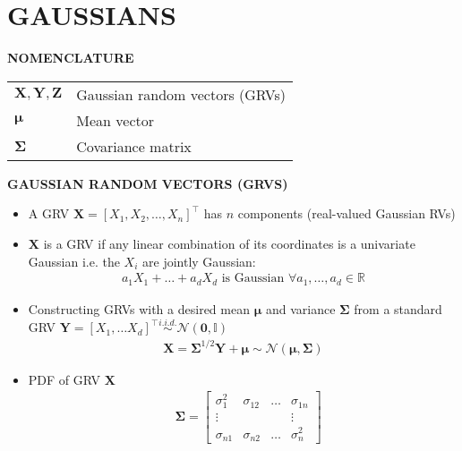 \section{GAUSSIANS}

\begin{yellowbox}{\textbf{NOMENCLATURE}}
    \begin{tabularx}{\columnwidth}{ll}
        $\bm{X},\bm{Y},\bm{Z}$ & Gaussian random vectors (GRVs)\\
        \addlinespace[2pt]
        $\bm{\mu}$ & Mean vector\\
        \addlinespace[2pt]
        $\bm{\Sigma}$ & Covariance matrix
    \end{tabularx}
\end{yellowbox}


\begin{whitebox}{\textbf{GAUSSIAN RANDOM VECTORS (GRVS)}}
    \begin{itemize}
        \item A GRV $\bm{X}=[X_1,X_2,\dots,X_n]^\top$ has $n$ components (real-valued Gaussian RVs)
        \item $\bm{X}$ is a GRV if any linear combination of its coordinates is a univariate Gaussian i.e. the $X_i$ are jointly Gaussian:
        \begin{align*}
            a_1X_1+\dots+a_dX_d\text{ is Gaussian }\forall a_1,\dots,a_d\in\mathbb{R}
        \end{align*}
        \item Constructing GRVs with a desired mean $\bm{\mu}$ and variance $\bm{\Sigma}$ from a standard GRV $\bm{Y}=[X_1,\dots X_d]^\top\overset{i.i.d.}{\sim}\mathcal{N}(\bm{0},\mathbb{I})$
        \begin{align*}
            \bm{X}=\bm{\Sigma}^{1/2}\bm{Y}+\bm{\mu}\sim\mathcal{N}(\bm{\mu},\bm{\Sigma})
        \end{align*}
        \item PDF of GRV $\bm{X}$
        \begin{align*}
            &\bm{\Sigma}=
            \begin{bmatrix}
                \sigma_1^2 & \sigma_{12} & \hdots & \sigma_{1n}\\
                \vdots & & & \vdots\\
                \sigma_{n1} & \sigma_{n2} & \hdots & \sigma_n^2

\end{bmatrix}
\end{align*}
\end{itemize}
\end{whitebox}
